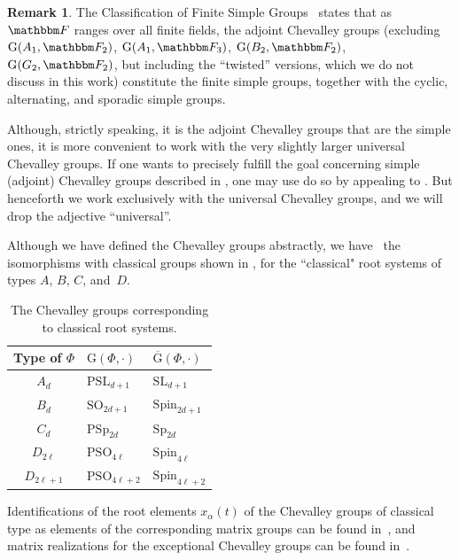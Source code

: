\documentclass[10pt,a4paper]{article}
\theoremstyle{definition}
\newtheorem{remark}[theorem]{Remark}
\newcommand{\F}{\mathbbm F}
\newcommand{\ol}[1]{\overline{#1}}
\newcommand{\Esc}[2]{\ol{\mathrm{G}}(#1,#2)}
\newcommand{\G}[2]{\mathrm{G}(#1,#2)}
\begin{document}
\begin{remark}  \label{rem:CFSG}
   The Classification of Finite Simple Groups~\cite{Asc04} states that as $\F$ ranges over all finite fields, the adjoint Chevalley groups (excluding $\G{A_1}{\F_2}$, $\G{A_1}{\F_3}$, $\G{B_2}{\F_2}$, $\G{G_2}{\F_2}$, but including the ``twisted'' versions, which we do not discuss in this work) constitute the finite simple groups, together with the cyclic, alternating, and sporadic simple groups.
\end{remark}
Although, strictly speaking, it is the adjoint Chevalley groups that are the simple ones, it is more convenient to work with the very slightly larger universal Chevalley groups.
If one wants to precisely fulfill the goal concerning simple (adjoint) Chevalley groups described in , one may use do so by appealing to .
But henceforth we work exclusively with the universal Chevalley groups, and we will drop the adjective ``universal''.

Although we have defined the Chevalley groups abstractly, we have~\cite[Sec.~3.3]{Ste16} the isomorphisms with classical groups shown in , for the ``classical" root systems of types $A$, $B$, $C$, and~$D$.

\begin{table}[H]
\centering
\begin{tabular}{cll}\label{table:classical}
Type of $\Phi$     & $\G{\Phi}{\cdot}$     & $\Esc{\Phi}{\cdot}$      \\ \hline
$A_d$      & $\mathrm{PSL}_{d+1}$  & $\mathrm{SL}_{d+1}$    \\
$B_d$      & $\mathrm{SO}_{2d+1}$  & $\mathrm{Spin}_{2d+1}$ \\
$C_d$      & $\mathrm{PSp}_{2d}$   & $\mathrm{Sp}_{2d}$     \\
$D_{2\ell}$   & $\mathrm{PSO}_{4\ell}$   & $\mathrm{Spin}_{4\ell}$\\
$D_{2\ell+1}$ & $\mathrm{PSO}_{4\ell+2}$ & $\mathrm{Spin}_{4\ell+2}$
\end{tabular}
\caption{The Chevalley groups corresponding to classical root systems.}
\label{tab:iso}
\end{table}

Identifications of the root elements $x_\alpha(t)$ of the Chevalley groups of classical type as elements of the corresponding matrix groups can be found in~\cite[Sec.~11.3]{Car89}, and matrix realizations for the exceptional Chevalley groups can be found in~\cite{HRT01}.
\end{document}

